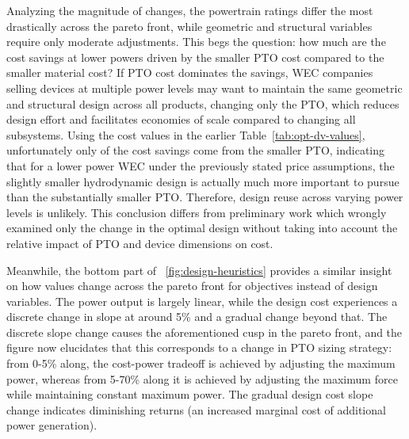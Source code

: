 Analyzing the magnitude of changes, the powertrain ratings differ the most drastically across the pareto front, while geometric and structural variables require only moderate adjustments. This begs the question: how much are the cost savings at lower powers driven by the smaller PTO cost compared to the smaller material cost? If PTO cost dominates the savings, WEC companies selling devices at multiple power levels may want to maintain the same geometric and structural design across all products, changing only the PTO, which reduces design effort and facilitates economies of scale compared to changing all subsystems. Using the cost values in the earlier Table~\ref{tab:opt-dv-values}, unfortunately only \pctCostSavingsFromPTO of the cost savings come from the smaller PTO, indicating that for a lower power WEC under the previously stated price assumptions, the slightly smaller hydrodynamic design is actually much more important to pursue than the substantially smaller PTO. Therefore, design reuse across varying power levels is unlikely. This conclusion differs from preliminary work \cite{mccabe_multidisciplinary_2022} which wrongly examined only the change in the optimal design without taking into account the relative impact of PTO and device dimensions on cost.

Meanwhile, the bottom part of \figureautorefname~\ref{fig:design-heuristics} provides a similar insight on how values change across the pareto front for objectives instead of design variables. %
The power output is largely linear, while the design cost experiences a discrete change in slope at around 5\% and a gradual change beyond that. The discrete slope change causes the aforementioned cusp in the pareto front, and the figure now elucidates that this corresponds to a change in PTO sizing strategy: from 0-5\% along, the cost-power tradeoff is achieved by adjusting the maximum power, whereas from 5-70\% along it is achieved by adjusting the maximum force while maintaining constant maximum power. The gradual design cost slope change indicates diminishing returns (an increased marginal cost of additional power generation).


